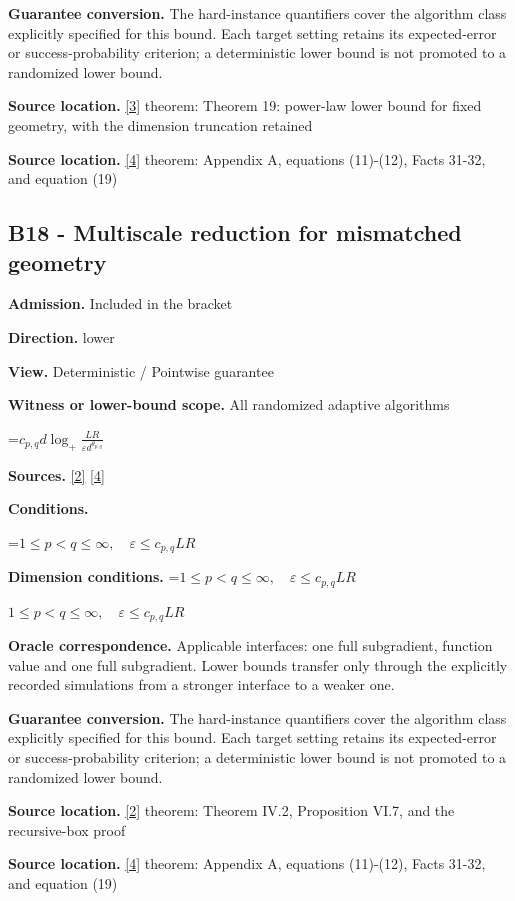 \documentclass[10pt,a4paper]{article}
\newcommand{\AtlasMath}[1]{\par\begingroup\centering\setbox0=\hbox{$\displaystyle #1$}\ifdim\wd0>1.4\linewidth\typeout{ATLAS WIDE FORMULA: \the\wd0}\fi\ifdim\wd0>\linewidth\resizebox{\linewidth}{!}{\box0}\else\box0\fi\par\endgroup}
\newcommand{\AtlasInlineMath}[1]{\begingroup\setbox0=\hbox{$#1$}\ifdim\wd0>.4\linewidth\endgroup\AtlasMath{#1}\else\endgroup$#1$\fi}
\begin{document}
\textbf{Guarantee conversion.} The hard-instance quantifiers cover the algorithm class explicitly specified for this bound. Each target setting retains its expected-error or success-probability criterion; a deterministic lower bound is not promoted to a randomized lower bound.

\textbf{Source location.} \href{https://arxiv.org/pdf/2609.20701}{[3]} theorem: Theorem 19: power-law lower bound for fixed geometry, with the dimension truncation retained

\textbf{Source location.} \href{https://arxiv.org/pdf/2609.20687}{[4]} theorem: Appendix A, equations (11)-(12), Facts 31-32, and equation (19)

\subsection{B18 - Multiscale reduction for mismatched geometry}
\textbf{Admission.} Included in the bracket

\textbf{Direction.} lower

\textbf{View.} Deterministic / Pointwise guarantee

\textbf{Witness or lower-bound scope.} All randomized adaptive algorithms

\AtlasMath{c_{p,q}d\log_+\frac{LR}{\varepsilon d^{\theta_{p,q}}}}
\textbf{Sources.} \href{https://arxiv.org/pdf/1407.5144}{[2]} \href{https://arxiv.org/pdf/2609.20687}{[4]}

\textbf{Conditions.} 
\AtlasMath{1\le p<q\le\infty,\quad\varepsilon\le c_{p,q}LR}


\textbf{Dimension conditions.} \AtlasInlineMath{1\le p<q\le\infty,\quad\varepsilon\le c_{p,q}LR}

\textbf{Oracle correspondence.} Applicable interfaces: one full subgradient, function value and one full subgradient. Lower bounds transfer only through the explicitly recorded simulations from a stronger interface to a weaker one.

\textbf{Guarantee conversion.} The hard-instance quantifiers cover the algorithm class explicitly specified for this bound. Each target setting retains its expected-error or success-probability criterion; a deterministic lower bound is not promoted to a randomized lower bound.

\textbf{Source location.} \href{https://arxiv.org/pdf/1407.5144}{[2]} theorem: Theorem IV.2, Proposition VI.7, and the recursive-box proof

\textbf{Source location.} \href{https://arxiv.org/pdf/2609.20687}{[4]} theorem: Appendix A, equations (11)-(12), Facts 31-32, and equation (19)
\end{document}
